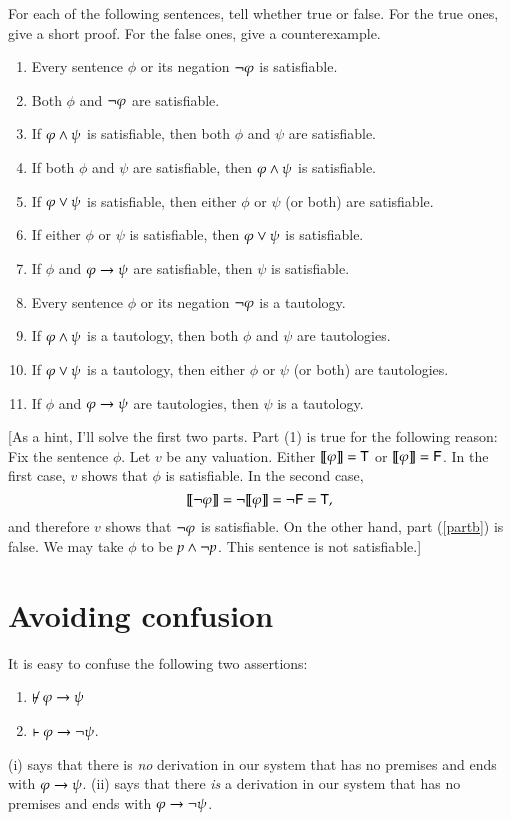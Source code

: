 \documentclass[12pt]{article}
\begin{document}
{For each of the following sentences, tell whether true
or false.  For the true ones, give a short proof.
For the false ones, give a counterexample.
\begin{enumerate}
\item Every sentence $\phi$ or its negation $\neg\varphi$ is satisfiable.
\item Both $\phi$ and $\neg\varphi$ are satisfiable. \label{partb}
\item If $\varphi\wedge\psi$ is satisfiable, then both $\phi$ and $\psi$ are satisfiable. 
\item If  both $\phi$ and $\psi$ are satisfiable,
then $\varphi\wedge\psi$ is satisfiable.
\item If $\varphi\vee\psi$ is satisfiable, then either $\phi$ or $\psi$
(or both) are satisfiable. 
\item If  either $\phi$ or $\psi$ is satisfiable,
then $\varphi\vee\psi$ is satisfiable.
\item  If $\phi$ and $\varphi\rightarrow\psi$ are satisfiable, then $\psi$ is satisfiable.
\item Every sentence $\phi$ or its negation $\neg\varphi$ is a tautology.
\item  If $\varphi\wedge\psi$ is a tautology, then both $\phi$ and $\psi$ are tautologies. 
\item If $\varphi\vee\psi$ is a tautology, then either $\phi$ or $\psi$
(or both) are tautologies. 
\item If $\phi$ and $\varphi\rightarrow\psi$ are tautologies, then $\psi$ is a tautology.
\end{enumerate}
[As a hint, I'll solve the first two parts.
Part (1) is true for the following reason: 
Fix the sentence $\phi$.   Let $v$ be any valuation.
Either $[\![\mbox{\em $\varphi$\/}]\!]  = {\sf T}$ or $[\![\mbox{\em $\varphi$\/}]\!] = {\sf F}$.
In the first case, $v$ shows that $\phi$ is satisfiable.
In the second case, 
$$[\![\mbox{\em $\neg\varphi$\/}]\!]  = \neg [\![\mbox{\em $\varphi$\/}]\!]  = \neg {\sf F}  = {\sf T},$$
and therefore $v$ shows that $\neg\varphi$ is satisfiable.
On the other hand, part (\ref{partb}) is false.
We may take $\phi$ to be $p\wedge\neg p$.  This sentence is not satisfiable.]

 


\section{Avoiding confusion}

It is easy to confuse 
the following two assertions:
\begin{enumerate}
\item[(i)]   $\not\proves \phi\iif \psi$ 
\item[(ii)]  $\vdash \varphi\rightarrow \neg\psi$.
\end{enumerate}
(i) says that there is \emph{no} derivation in our system that has no premises and ends with $\varphi\rightarrow \psi$.
(ii) says that there  \emph{is} a  derivation in our system that has no premises and ends with $ \varphi\rightarrow \neg\psi$.

}
\end{document}
